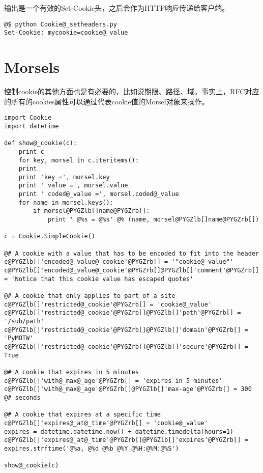 \documentclass[a4paper,10pt,english]{manual}
\begin{document}
输出是一个有效的Set-Cookie头，之后会作为HTTP响应传递给客户端。

\begin{Verbatim}[commandchars=@\[\]]
@$ python Cookie@_setheaders.py
Set-Cookie: mycookie=cookie@_value
\end{Verbatim}


\section{Morsels}

控制cookie的其他方面也是有必要的，比如说期限、路径、域。事实上，RFC对应的所有的cookies属性可以通过代表cookie值的Morsel对象来操作。

\begin{Verbatim}[commandchars=@\[\]]
import Cookie
import datetime

def show@_cookie(c):
    print c
    for key, morsel in c.iteritems():
    print
    print 'key =', morsel.key
    print ' value =', morsel.value
    print ' coded@_value =', morsel.coded@_value
    for name in morsel.keys():
        if morsel@PYGZlb[]name@PYGZrb[]:
            print ' @%s = @%s' @% (name, morsel@PYGZlb[]name@PYGZrb[])

c = Cookie.SimpleCookie()

@# A cookie with a value that has to be encoded to fit into the header
c@PYGZlb[]'encoded@_value@_cookie'@PYGZrb[] = '"cookie@_value"'
c@PYGZlb[]'encoded@_value@_cookie'@PYGZrb[]@PYGZlb[]'comment'@PYGZrb[] = 'Notice that this cookie value has escaped quotes'

@# A cookie that only applies to part of a site
c@PYGZlb[]'restricted@_cookie'@PYGZrb[] = 'cookie@_value'
c@PYGZlb[]'restricted@_cookie'@PYGZrb[]@PYGZlb[]'path'@PYGZrb[] = '/sub/path'
c@PYGZlb[]'restricted@_cookie'@PYGZrb[]@PYGZlb[]'domain'@PYGZrb[] = 'PyMOTW'
c@PYGZlb[]'restricted@_cookie'@PYGZrb[]@PYGZlb[]'secure'@PYGZrb[] = True

@# A cookie that expires in 5 minutes
c@PYGZlb[]'with@_max@_age'@PYGZrb[] = 'expires in 5 minutes'
c@PYGZlb[]'with@_max@_age'@PYGZrb[]@PYGZlb[]'max-age'@PYGZrb[] = 300 @# seconds

@# A cookie that expires at a specific time
c@PYGZlb[]'expires@_at@_time'@PYGZrb[] = 'cookie@_value'
expires = datetime.datetime.now() + datetime.timedelta(hours=1)
c@PYGZlb[]'expires@_at@_time'@PYGZrb[]@PYGZlb[]'expires'@PYGZrb[] = expires.strftime('@%a, @%d @%b @%Y @%H:@%M:@%S')

show@_cookie(c)
\end{Verbatim}
\end{document}
